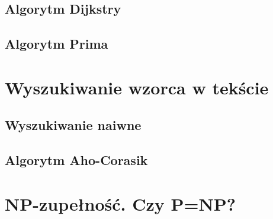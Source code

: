 \documentclass[10pt, oneside]{article}
\theoremstyle{remark}
\begin{document}
\subsection{Algorytm Dijkstry}
\subsection{Algorytm Prima}

\section{Wyszukiwanie wzorca w tekście}

\subsection{Wyszukiwanie naiwne}

\subsection{Algorytm Aho-Corasik}

\section{NP-zupełność. Czy P=NP?}
\end{document}
